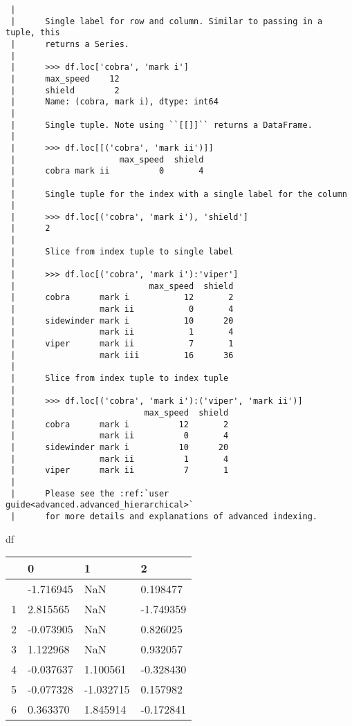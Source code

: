 \documentclass[
  letterpaper,
  DIV=11,
  numbers=noendperiod]{scrreprt}
\newenvironment{Shaded}{\begin{snugshade}}{\end{snugshade}}
\newcommand{\NormalTok}[1]{\textcolor[rgb]{0.00,0.23,0.31}{#1}}
\begin{document}
\begin{verbatim}
 |      
 |      Single label for row and column. Similar to passing in a tuple, this
 |      returns a Series.
 |      
 |      >>> df.loc['cobra', 'mark i']
 |      max_speed    12
 |      shield        2
 |      Name: (cobra, mark i), dtype: int64
 |      
 |      Single tuple. Note using ``[[]]`` returns a DataFrame.
 |      
 |      >>> df.loc[[('cobra', 'mark ii')]]
 |                     max_speed  shield
 |      cobra mark ii          0       4
 |      
 |      Single tuple for the index with a single label for the column
 |      
 |      >>> df.loc[('cobra', 'mark i'), 'shield']
 |      2
 |      
 |      Slice from index tuple to single label
 |      
 |      >>> df.loc[('cobra', 'mark i'):'viper']
 |                           max_speed  shield
 |      cobra      mark i           12       2
 |                 mark ii           0       4
 |      sidewinder mark i           10      20
 |                 mark ii           1       4
 |      viper      mark ii           7       1
 |                 mark iii         16      36
 |      
 |      Slice from index tuple to index tuple
 |      
 |      >>> df.loc[('cobra', 'mark i'):('viper', 'mark ii')]
 |                          max_speed  shield
 |      cobra      mark i          12       2
 |                 mark ii          0       4
 |      sidewinder mark i          10      20
 |                 mark ii          1       4
 |      viper      mark ii          7       1
 |      
 |      Please see the :ref:`user guide<advanced.advanced_hierarchical>`
 |      for more details and explanations of advanced indexing.
\end{verbatim}

\begin{Shaded}
\begin{Highlighting}[]
\NormalTok{df}
\end{Highlighting}
\end{Shaded}

\begin{longtable}[]{@{}llll@{}}
\toprule\noalign{}
& 0 & 1 & 2 \\
\midrule\noalign{}
\endhead
\bottomrule\noalign{}
\endlastfoot
0 & -1.716945 & NaN & 0.198477 \\
1 & 2.815565 & NaN & -1.749359 \\
2 & -0.073905 & NaN & 0.826025 \\
3 & 1.122968 & NaN & 0.932057 \\
4 & -0.037637 & 1.100561 & -0.328430 \\
5 & -0.077328 & -1.032715 & 0.157982 \\
6 & 0.363370 & 1.845914 & -0.172841 \\
\end{longtable}
\end{document}
